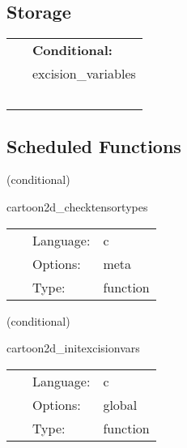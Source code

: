 \documentclass{article}
\begin{document}
\subsection*{Storage}

\hspace{5mm}

 \begin{tabular*}{160mm}{ll} 
~& {\bf Conditional:} \\ 
~ &  excision\_variables\\ 
~ & ~\\ 
\end{tabular*} 


\subsection*{Scheduled Functions}
\vspace{5mm}

   (conditional) 

\hspace{5mm} cartoon2d\_checktensortypes 

\hspace{5mm}{\it check tensor type definitions for consistency } 


\hspace{5mm}

 \begin{tabular*}{160mm}{cll} 
~ & Language:  & c \\ 
~ & Options:  & meta \\ 
~ & Type:  & function \\ 
\end{tabular*} 


\vspace{5mm}

   (conditional) 

\hspace{5mm} cartoon2d\_initexcisionvars 

\hspace{5mm}{\it initialize the excision variables } 


\hspace{5mm}

 \begin{tabular*}{160mm}{cll} 
~ & Language:  & c \\ 
~ & Options:  & global \\ 
~ & Type:  & function \\ 
\end{tabular*} 
\end{document}
